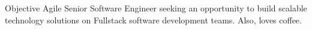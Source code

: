 \begin{section}{Objective}
  Agile Senior Software Engineer seeking an opportunity to build scalable technology solutions on Fullstack software development teams. Also, loves coffee.
\end{section}
